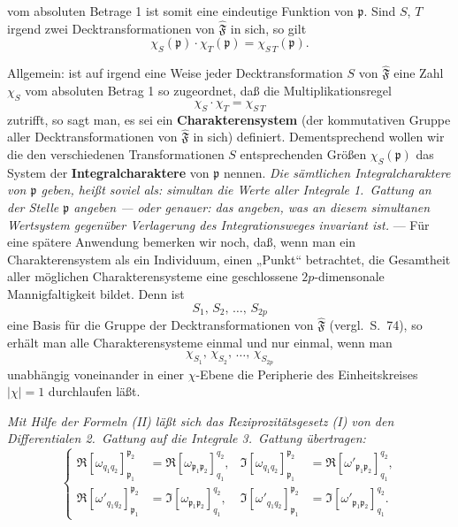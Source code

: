 \documentclass{article}
\begin{document}
vom absoluten Betrage 1 ist somit eine eindeutige Funktion von $\mathfrak{p}$. Sind $S$, $T$ irgend zwei Decktransformationen von $\hat{\mathfrak{F}}$ in sich, so gilt
\[ \chi_S(\mathfrak{p}) \cdot \chi_T(\mathfrak{p}) = \chi_{S\,T}(\mathfrak{p}). \]

Allgemein: ist auf irgend eine Weise jeder Decktransformation $S$ von $\hat{\mathfrak{F}}$ eine Zahl $\chi_S$ vom absoluten Betrag 1 so zugeordnet, daß die Multiplikationsregel
\[ \chi_S \cdot \chi_T = \chi_{S\,T} \]
zutrifft, so sagt man, es sei ein \textbf{Charakterensystem} (der kommutativen Gruppe aller Decktransformationen von $\hat{\mathfrak{F}}$ in sich) definiert. Dementsprechend wollen wir die den verschiedenen Transformationen $S$ entsprechenden Größen $\chi_S(\mathfrak{p})$ das System der \textbf{Integralcharaktere} von $\mathfrak{p}$ nennen. \emph{Die sämtlichen Integralcharaktere von $\mathfrak{p}$ geben, heißt soviel als: simultan die Werte aller Integrale 1.\ Gattung an der Stelle $\mathfrak{p}$ angeben --- oder genauer: das angeben, was an diesem simultanen Wertsystem gegenüber Verlagerung des Integrationsweges invariant ist.} --- Für eine spätere Anwendung bemerken wir noch, daß, wenn man ein Charakterensystem als ein Individuum, einen „Punkt“ betrachtet, die Gesamtheit aller möglichen Charakterensysteme eine geschlossene $2p$-dimensonale Mannigfaltigkeit bildet. Denn ist
\[ S_1, \, S_2, \, \dots, \, S_{2p} \]
eine Basis für die Gruppe der Decktransformationen von $\hat{\mathfrak{F}}$ (vergl.\ S.~74), so erhält man alle Charakterensysteme einmal und nur einmal, wenn man
\[ \chi_{S_1}, \, \chi_{S_2}, \, \dots, \, \chi_{S_{2p}} \]
unabhängig voneinander in einer $\chi$-Ebene die Peripherie des Einheitskreises $|\chi| = 1$ durchlaufen läßt.

\emph{Mit Hilfe der Formeln (II) läßt sich das Reziprozitätsgesetz (I) von den Differentialen 2.\ Gattung auf die Integrale 3.\ Gattung übertragen:}
\[ \left\{ \begin{aligned}
\Re [\omega_{q_1 q_2}]_{\mathfrak{p}_1}^{\mathfrak{p}_2} &= \Re [\omega_{\mathfrak{p}_1 \mathfrak{p}_2}]_{q_1}^{q_2}, & \Im [\omega_{q_1 q_2}]_{\mathfrak{p}_1}^{\mathfrak{p}_2} &= \Re [\omega'_{\mathfrak{p}_1 \mathfrak{p}_2}]_{q_1}^{q_2}, \\
\Re [\omega'_{q_1 q_2}]_{\mathfrak{p}_1}^{\mathfrak{p}_2} &= \Im [\omega_{\mathfrak{p}_1 \mathfrak{p}_2}]_{q_1}^{q_2}, & \Im [\omega'_{q_1 q_2}]_{\mathfrak{p}_1}^{\mathfrak{p}_2} &= \Im [\omega'_{\mathfrak{p}_1 \mathfrak{p}_2}]_{q_1}^{q_2}.
\end{aligned} \right. \tag{III} \]
\end{document}
